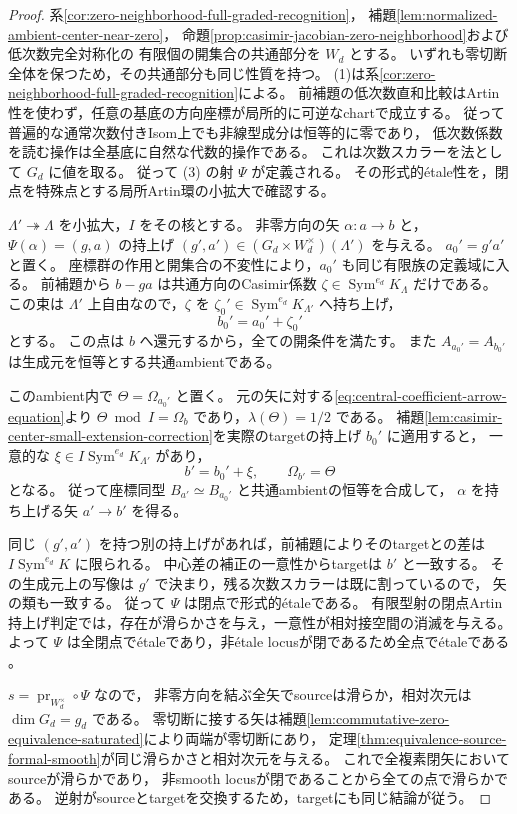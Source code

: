 \begin{proof}
系\ref{cor:zero-neighborhood-full-graded-recognition}，
補題\ref{lem:normalized-ambient-center-near-zero}，
命題\ref{prop:casimir-jacobian-zero-neighborhood}および低次数完全対称化の
有限個の開集合の共通部分を $W_d$ とする。
いずれも零切断全体を保つため，その共通部分も同じ性質を持つ。
(1)は系\ref{cor:zero-neighborhood-full-graded-recognition}による。
前補題の低次数直和比較はArtin性を使わず，任意の基底の方向座標が局所的に可逆なchartで成立する。
従って普遍的な通常次数付きIsom上でも非線型成分は恒等的に零であり，
低次数係数を読む操作は全基底に自然な代数的操作である。
これは次数スカラーを法として $G_d$ に値を取る。
従って (3) の射 $\Psi$ が定義される。
その形式的\'{e}tale性を，閉点を特殊点とする局所Artin環の小拡大で確認する。

$\Lambda'\twoheadrightarrow\Lambda$ を小拡大，$I$ をその核とする。
非零方向の矢 $\alpha:a\to b$ と，
$\Psi(\alpha)=(g,a)$ の持上げ $(g',a')\in(G_d\times W_d^\times)(\Lambda')$ を与える。
$a_0'=g'a'$ と置く。
座標群の作用と開集合の不変性により，$a_0'$ も同じ有限族の定義域に入る。
前補題から $b-ga$ は共通方向のCasimir係数
$\zeta\in\operatorname{Sym}^{e_d}K_\Lambda$ だけである。
この束は $\Lambda'$ 上自由なので，$\zeta$ を
$\zeta_0'\in\operatorname{Sym}^{e_d}K_{\Lambda'}$ へ持ち上げ，
\[
                   b_0'=a_0'+\zeta_0'
\]
とする。
この点は $b$ へ還元するから，全ての開条件を満たす。
また $A_{a_0'}=A_{b_0'}$ は生成元を恒等とする共通ambientである。

このambient内で $\Theta=\Omega_{a_0'}$ と置く。
元の矢に対する\eqref{eq:central-coefficient-arrow-equation}より
$\Theta\bmod I=\Omega_b$ であり，$\lambda(\Theta)=1/2$ である。
補題\ref{lem:casimir-center-small-extension-correction}を実際のtargetの持上げ $b_0'$ に適用すると，
一意的な $\xi\in I\operatorname{Sym}^{e_d}K_{\Lambda'}$ があり，
\[
              b'=b_0'+\xi,
              \qquad\Omega_{b'}=\Theta
\]
となる。
従って座標同型 $B_{a'}\simeq B_{a_0'}$ と共通ambientの恒等を合成して，
$\alpha$ を持ち上げる矢 $a'\to b'$ を得る。

同じ $(g',a')$ を持つ別の持上げがあれば，前補題によりそのtargetとの差は
$I\operatorname{Sym}^{e_d}K$ に限られる。
中心差の補正の一意性からtargetは $b'$ と一致する。
その生成元上の写像は $g'$ で決まり，残る次数スカラーは既に割っているので，
矢の類も一致する。
従って $\Psi$ は閉点で形式的\'{e}taleである。
有限型射の閉点Artin持上げ判定では，存在が滑らかさを与え，一意性が相対接空間の消滅を与える。
よって $\Psi$ は全閉点で\'{e}taleであり，非\'{e}tale locusが閉であるため全点で\'{e}taleである
\cite[Tags 02HY, 02HM]{StacksProject}。

$s=\operatorname{pr}_{W_d^\times}\circ\Psi$ なので，
非零方向を結ぶ全矢でsourceは滑らか，相対次元は $\dim G_d=g_d$ である。
零切断に接する矢は補題\ref{lem:commutative-zero-equivalence-saturated}により両端が零切断にあり，
定理\ref{thm:equivalence-source-formal-smooth}が同じ滑らかさと相対次元を与える。
これで全複素閉矢においてsourceが滑らかであり，
非smooth locusが閉であることから全ての点で滑らかである。
逆射がsourceとtargetを交換するため，targetにも同じ結論が従う。
\end{proof}

